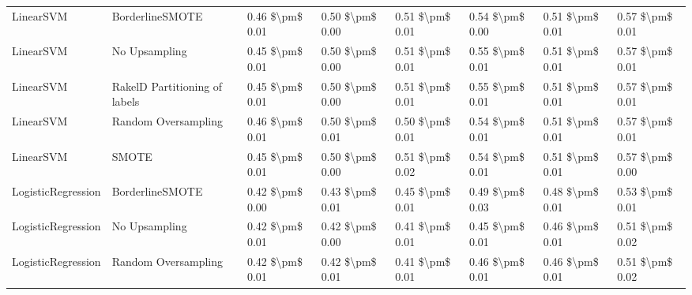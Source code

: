 \begin{tabular}{llllllll}
                      LinearSVM &               BorderlineSMOTE & 0.46 \$\textbackslash pm\$ 0.01 &           0.50 \$\textbackslash pm\$ 0.00 &       0.51 \$\textbackslash pm\$ 0.01 &        0.54 \$\textbackslash pm\$ 0.00 &                         0.51 \$\textbackslash pm\$ 0.01 &     0.57 \$\textbackslash pm\$ 0.01 \\
                      LinearSVM &                 No Upsampling & 0.45 \$\textbackslash pm\$ 0.01 &           0.50 \$\textbackslash pm\$ 0.00 &       0.51 \$\textbackslash pm\$ 0.01 &        0.55 \$\textbackslash pm\$ 0.01 &                         0.51 \$\textbackslash pm\$ 0.01 &     0.57 \$\textbackslash pm\$ 0.01 \\
                      LinearSVM & RakelD Partitioning of labels & 0.45 \$\textbackslash pm\$ 0.01 &           0.50 \$\textbackslash pm\$ 0.00 &       0.51 \$\textbackslash pm\$ 0.01 &        0.55 \$\textbackslash pm\$ 0.01 &                         0.51 \$\textbackslash pm\$ 0.01 &     0.57 \$\textbackslash pm\$ 0.01 \\
                      LinearSVM &           Random Oversampling & 0.46 \$\textbackslash pm\$ 0.01 &           0.50 \$\textbackslash pm\$ 0.01 &       0.50 \$\textbackslash pm\$ 0.01 &        0.54 \$\textbackslash pm\$ 0.01 &                         0.51 \$\textbackslash pm\$ 0.01 &     0.57 \$\textbackslash pm\$ 0.01 \\
                      LinearSVM &                         SMOTE & 0.45 \$\textbackslash pm\$ 0.01 &           0.50 \$\textbackslash pm\$ 0.00 &       0.51 \$\textbackslash pm\$ 0.02 &        0.54 \$\textbackslash pm\$ 0.01 &                         0.51 \$\textbackslash pm\$ 0.01 &     0.57 \$\textbackslash pm\$ 0.00 \\
             LogisticRegression &               BorderlineSMOTE & 0.42 \$\textbackslash pm\$ 0.00 &           0.43 \$\textbackslash pm\$ 0.01 &       0.45 \$\textbackslash pm\$ 0.01 &        0.49 \$\textbackslash pm\$ 0.03 &                         0.48 \$\textbackslash pm\$ 0.01 &     0.53 \$\textbackslash pm\$ 0.01 \\
             LogisticRegression &                 No Upsampling & 0.42 \$\textbackslash pm\$ 0.01 &           0.42 \$\textbackslash pm\$ 0.00 &       0.41 \$\textbackslash pm\$ 0.01 &        0.45 \$\textbackslash pm\$ 0.01 &                         0.46 \$\textbackslash pm\$ 0.01 &     0.51 \$\textbackslash pm\$ 0.02 \\
             LogisticRegression &           Random Oversampling & 0.42 \$\textbackslash pm\$ 0.01 &           0.42 \$\textbackslash pm\$ 0.01 &       0.41 \$\textbackslash pm\$ 0.01 &        0.46 \$\textbackslash pm\$ 0.01 &                         0.46 \$\textbackslash pm\$ 0.01 &     0.51 \$\textbackslash pm\$ 0.02 \\

\end{tabular}
